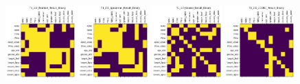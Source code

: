 \begin{figure}
    \includegraphics[width=0.24\textwidth]{chap6/figs/T1_2.0_Pearson_Result_Binary.png}
    \includegraphics[width=0.24\textwidth]{chap6/figs/T1_2.0_Spearman_Result_Binary.png}
    \includegraphics[width=0.24\textwidth]{chap6/figs/T1_2.0_Glasso_Result_Binary.png}
    \includegraphics[width=0.24\textwidth]{chap6/figs/T1_2.0_CODEC_Result_Binary.png}
    

\end{figure}
